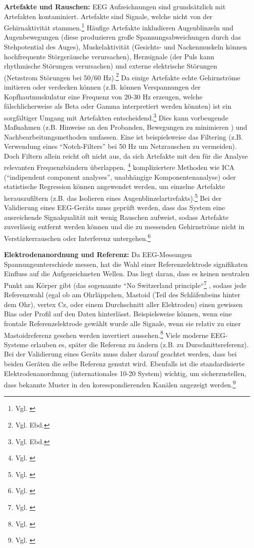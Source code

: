 \textbf{Artefakte und Rauschen:} EEG Aufzeichnungen sind grundsätzlich mit Artefakten kontaminiert. Artefakte sind Signale, welche nicht von der Gehirnaktivität stammen.\footnote{Vgl. \cite{wiki_eeg_english}} Häufige Artefakte inkludieren Augenblinzeln und Augenbewegungen (diese produzieren große Spannungsabweichungen durch das Stehpotential des Auges), Muskelaktivität (Gesichts- und Nackenmuskeln können hochfrequente Störgeräusche verursachen), Herzsignale (der Puls kann rhythmische Störungen verursachen) und externe elektrische Störungen (Netzstrom Störungen bei 50/60 Hz).\footnote{Vgl. Ebd.} Da einige Artefakte echte Gehirnströme imitieren oder verdecken können (z.B. können Verspannungen der Kopfhautmuskulatur eine Frequenz von 20-30 Hz erzeugen, welche fälschlicherweise als Beta oder Gamma interpretiert werden könnten) ist ein sorgfältiger Umgang mit Artefakten entscheidend.\footnote{Vgl. Ebd.} Dies kann vorbeugende Maßnahmen (z.B. Hinweise an den Probanden, Bewegungen zu minimieren ) und Nachbearbeitungsmethoden umfassen. Eine ist beispielsweise das Filtering (z.B. Verwendung eines “Notch-Filters” bei 50 Hz um Netzrauschen zu vermeiden). Doch Filtern allein reicht oft nicht aus, da sich Artefakte mit den für die Analyse relevanten Frequenzbändern überlappen. \footnote{Vgl. \cite{acns_guideline2}} kompliziertere Methoden wie ICA (“indipendent component analyses”, unabhängige Komponentenanalyse) oder statistische Regression können angewendet werden, um einzelne Artefakte herauszufiltern (z.B. das Isolieren eines Augenblinzelartrefakts).\footnote{Vgl. \cite{acns_guideline2}}  Bei der Validierung eines EEG-Geräts muss geprüft werden, dass das System eine ausreichende Signalqualität mit  wenig Rauschen aufweist, sodass Artefakte zuverlässig entfernt werden können und die zu messenden Gehirnströme nicht in Verstärkerrauschen oder Interferenz untergehen.\footnote{Vgl. \cite{acns_guideline2}} 

\textbf{Elektrodenanordnung und Referenz:} Da EEG-Messungen Spannungsunterschiede messen, hat die Wahl einer Referenzelektrode signifikaten Einfluss auf die Aufgezeichneten Wellen. Das liegt daran, dass es keinen neutralen Punkt am Körper gibt (das sogenannte “No Switzerland principle“\footnote{Vgl. \cite{acns_guideline2}} , sodass jede Referenzwahl (egal ob am Ohrläppchen, Mastoid (Teil des Schläfenbeins hinter dem Ohr), vertex Cz, oder einem Durchschnitt aller Elektroden) einen gewissen Bias oder Profil auf den Daten hinterlässt. Beispielsweise können, wenn eine frontale Referenzelektrode gewählt wurde alle Signale, wenn sie relativ zu einer Mastoidreferenz gesehen werden invertiert aussehen.\footnote{Vgl. \cite{wikipedia_eeg_nyquist}}  Viele moderne EEG-Systeme erlauben es, später die Referenz zu ändern (z.B. zu Durschnittsreferenz). Bei der Validierung eines Geräts muss daher darauf geachtet werden, dass bei beiden Geräten die selbe Referenz genutzt wird. Ebenfalls ist die standardisierte Elektrodenanordnung (internationales 10-20 System) wichtig, um sicherzustellen, dass bekannte Muster in den koresspondierenden Kanälen angezeigt werden.\footnote{Vgl. \cite{acns_guideline2}} 


